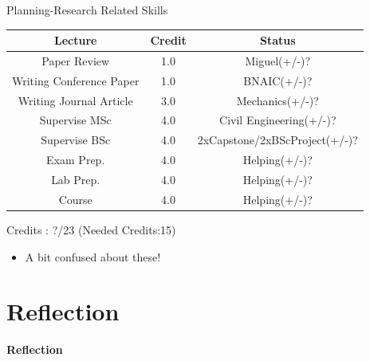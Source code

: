 \documentclass[aspectratio=169]{beamer}
\newcommand{\reflect}{\color{Pink}\huge{\textbf{Reflection}}}
\begin{document}
\begin{frame}{Planning-Research Related Skills}
  \centering
  \begin{tabular}{ c|c|c } 
    \textbf{Lecture} & \textbf{Credit}& \textbf{Status} \\ 
    \hline
    \color{Pink}Paper Review  & 1.0 & Miguel(+/-)? \\ 
    \color{Pink}Writing Conference Paper & 1.0 & BNAIC(+/-)? \\ 
    \color{Pink}Writing Journal Article & 3.0 & Mechanics(+/-)? \\ 
    \color{Pink}Supervise MSc & 4.0 & Civil Engineering(+/-)? \\ 
    \color{Pink}Supervise BSc & 4.0 &  2xCapstone/2xBScProject(+/-)?\\ 
    \color{Pink}Exam Prep. & 4.0 & Helping(+/-)? \\ 
    \color{Pink}Lab Prep. & 4.0 & Helping(+/-)? \\ 
    \color{Pink}Course & 4.0 & Helping(+/-)? \\ 
    \hline
  \end{tabular}

  \centering
    Credits : ?/23 (Needed Credits:15)
  \begin{itemize}
    \item A bit confused about these!
  \end{itemize}
\end{frame}

\section{Reflection}

\begin{frame}
  \centering
  \reflect
\end{frame}
\end{document}
